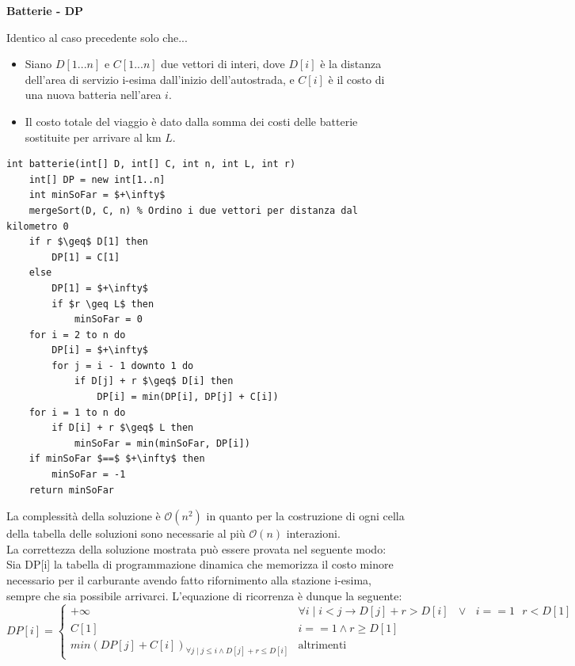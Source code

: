 \documentclass[../cheatSheetAlgoritmi.tex]{subfiles}
\begin{document}
\begin{flushleft}
\textbf{Batterie - DP}
\end{flushleft}
Identico al caso precedente solo che...


\begin{itemize}
	\item Siano $D[1...n]$ e $C[1...n]$ due vettori di interi, dove $D[i]$ è la distanza dell'area di servizio i-esima dall'inizio dell'autostrada, e $C[i]$ è il costo di una nuova batteria nell'area $i$.
	\item Il costo totale del viaggio è dato dalla somma dei costi delle batterie sostituite per arrivare al km $L$.
\end{itemize}
\begin{lstlisting}[caption=Batterie DP]
int batterie(int[] D, int[] C, int n, int L, int r)
    int[] DP = new int[1..n]
    int minSoFar = $+\infty$
    mergeSort(D, C, n) % Ordino i due vettori per distanza dal kilometro 0
    if r $\geq$ D[1] then
        DP[1] = C[1]
    else
        DP[1] = $+\infty$
        if $r \geq L$ then
            minSoFar = 0
    for i = 2 to n do
        DP[i] = $+\infty$
        for j = i - 1 downto 1 do
            if D[j] + r $\geq$ D[i] then
                DP[i] = min(DP[i], DP[j] + C[i])
    for i = 1 to n do
        if D[i] + r $\geq$ L then
            minSoFar = min(minSoFar, DP[i])
    if minSoFar $==$ $+\infty$ then
        minSoFar = -1
    return minSoFar
\end{lstlisting}
La complessità della soluzione è $\mathcal{O}(n^2)$ in quanto per la costruzione di ogni cella della tabella delle soluzioni sono necessarie al più $\mathcal{O}(n)$ interazioni. \\
La correttezza della soluzione mostrata può essere provata nel seguente modo: \\
Sia DP[i] la tabella di programmazione dinamica che memorizza il costo minore necessario per il carburante avendo fatto rifornimento alla stazione i-esima, sempre che sia possibile arrivarci. L'equazione di ricorrenza è dunque la seguente:
\begin{equation*}
    DP[i]=\begin{cases}
        + \infty & \text{$\forall i \mid i < j \rightarrow D[j] + r > D[i]$ $\lor$ $i == 1$ $r < D[1]$} \\
        C[1] & \text{$i == 1 \land r \geq D[1]$}\\
        min(DP[j] + C[i])_{\forall j \mid j \leq i \land D[j] + r \leq D[i]} & \text{altrimenti}
    \end{cases}
\end{equation*} 
\end{document}
